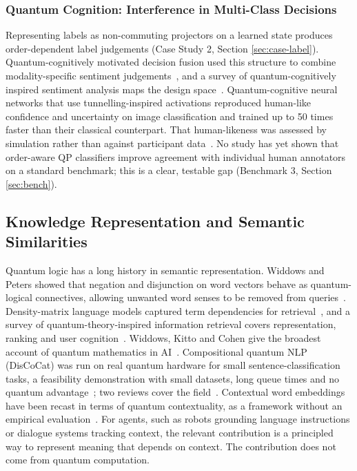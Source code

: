 \documentclass[pdflatex,sn-basic]{sn-jnl}
\begin{document}
\subsubsection{Quantum Cognition: Interference in Multi-Class Decisions}
Representing labels as non-commuting projectors on a learned state produces order-dependent label judgements (Case Study 2, Section \ref{sec:case-label}). Quantum-cognitively motivated decision fusion used this structure to combine modality-specific sentiment judgements~\citep{Gkoumas2021}, and a survey of quantum-cognitively inspired sentiment analysis maps the design space~\citep{Liu2023}. Quantum-cognitive neural networks that use tunnelling-inspired activations reproduced human-like confidence and uncertainty on image classification and trained up to 50 times faster than their classical counterpart. That human-likeness was assessed by simulation rather than against participant data~\citep{Maksimovic2025}. No study has yet shown that order-aware QP classifiers improve agreement with individual human annotators on a standard benchmark; this is a clear, testable gap (Benchmark 3, Section \ref{sec:bench}).

\subsection{Knowledge Representation and Semantic Similarities}\label{sec:semantics}
Quantum logic has a long history in semantic representation. Widdows and Peters showed that negation and disjunction on word vectors behave as quantum-logical connectives, allowing unwanted word senses to be removed from queries~\citep{Widdows2003}. Density-matrix language models captured term dependencies for retrieval~\citep{Sordoni2013}, and a survey of quantum-theory-inspired information retrieval covers representation, ranking and user cognition~\citep{Uprety2021}. Widdows, Kitto and Cohen give the broadest account of quantum mathematics in AI~\citep{Widdows2021}. Compositional quantum NLP (DisCoCat) was run on real quantum hardware for small sentence-classification tasks, a feasibility demonstration with small datasets, long queue times and no quantum advantage~\citep{Lorenz2023}; two reviews cover the field~\citep{Widdows2024,Nausheen2025}. Contextual word embeddings have been recast in terms of quantum contextuality, as a framework without an empirical evaluation~\citep{Svozil2025}. For agents, such as robots grounding language instructions or dialogue systems tracking context, the relevant contribution is a principled way to represent meaning that depends on context. The contribution does not come from quantum computation.
\end{document}
